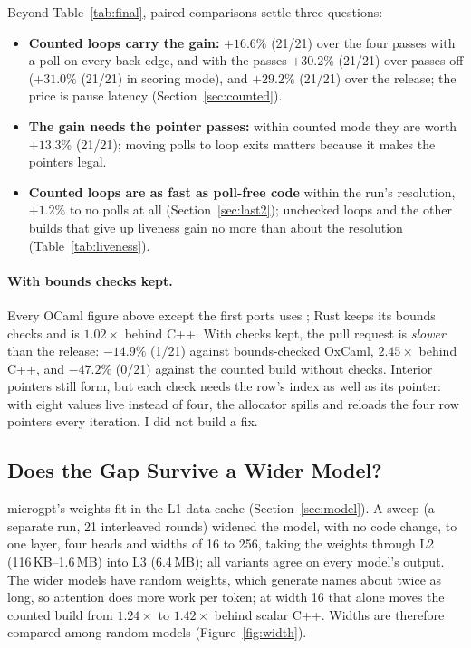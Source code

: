 Beyond Table~\ref{tab:final}, paired comparisons settle three questions:

\begin{itemize}
  \item \textbf{Counted loops carry the gain:} $+16.6\%$ (21/21)
        over the four passes with a poll on every back edge, and with the
        passes $+30.2\%$ (21/21) over passes off
        ($+31.0\%$ (21/21) in scoring mode), and
        $+29.2\%$ (21/21) over the release; the price is
        pause latency (Section~\ref{sec:counted}).
  \item \textbf{The gain needs the pointer passes:} within counted mode they
        are worth $+13.3\%$ (21/21); moving polls to loop exits
        matters because it makes the pointers legal.
  \item \textbf{Counted loops are as fast as poll-free code} within the run's
        resolution, $+1.2\%$ to no polls at all
        (Section~\ref{sec:last2}); unchecked loops and the other builds that
        give up liveness gain no more than about the resolution
        (Table~\ref{tab:liveness}).
\end{itemize}

\paragraph{With bounds checks kept.} Every OCaml figure above except the
first ports uses ; Rust keeps its bounds checks and is
$1.02\times$ behind C++. With checks kept, the pull request is
\emph{slower} than the release: $-14.9\%$ (1/21) against
bounds-checked OxCaml, $2.45\times$ behind C++, and
$-47.2\%$ (0/21) against the counted build without checks.
Interior pointers still form, but each check needs the row's index as well as
its pointer: with eight values live instead of four, the allocator spills and
reloads the four row pointers every iteration. I did not build a fix.

\subsection{Does the Gap Survive a Wider Model?}
\label{sec:width}
microgpt's weights fit in the L1 data cache (Section~\ref{sec:model}). A
sweep (a separate run, 21 interleaved rounds) widened the model, with no code
change, to one layer, four heads and widths of 16 to 256, taking the weights
through L2 (116\,KB--1.6\,MB) into L3 (6.4\,MB); all variants agree on every
model's output. The wider models have random weights, which generate names
about twice as long, so attention does more work per token; at width 16 that
alone moves the counted build from $1.24\times$ to $1.42\times$ behind scalar
C++. Widths are therefore compared among random models
(Figure~\ref{fig:width}).

